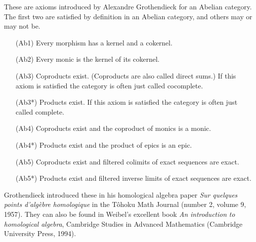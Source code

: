 \documentclass[12pt]{article}
\begin{document}
These are axioms introduced by Alexandre Grothendieck for an Abelian category.  The first two are satisfied by definition in an Abelian category, and others may or may not be.

\begin{itemize}
  \item[(Ab1)] Every morphism has a kernel and a cokernel.
  \item[(Ab2)] Every monic is the kernel of its cokernel.
  \item[(Ab3)] Coproducts exist.  (Coproducts are also called direct sums.)  If this axiom is satisfied the category is often just called cocomplete.
  \item[(Ab3*)] Products exist.  If this axiom is satisfied the category is often just called complete.
  \item[(Ab4)] Coproducts exist and the coproduct of monics is a monic.
  \item[(Ab4*)] Products exist and the product of epics is an epic.
  \item[(Ab5)] Coproducts exist and filtered colimits of exact sequences are exact.
  \item[(Ab5*)] Products exist and filtered inverse limits of exact sequences are exact.
\end{itemize}

Grothendieck introduced these in his homological algebra paper \emph{Sur quelques points d'alg\`ebre homologique} in the T\^ohoku Math Journal (number 2, volume 9, 1957).  They can also be found in Weibel's excellent book \emph{An introduction to homological algebra}, Cambridge Studies in Advanced Mathematics (Cambridge University Press, 1994).
\end{document}
